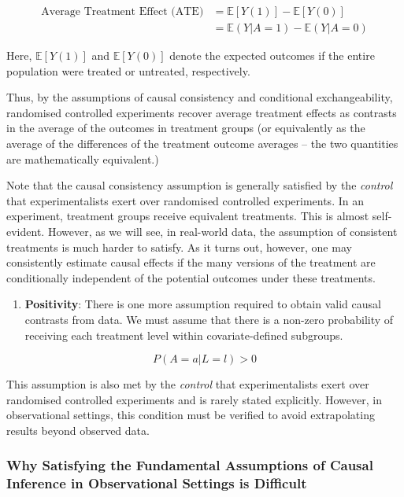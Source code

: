 \documentclass[
  singlecolumn]{article}
\providecommand{\tightlist}{%
  \setlength{\itemsep}{0pt}\setlength{\parskip}{0pt}}\usepackage{longtable,booktabs,array}
\begin{document}
\[
\begin{aligned}
\text{Average Treatment Effect (ATE)} &= \mathbb{E}[Y(1)] - \mathbb{E}[Y(0)] \\
&= \mathbb{E}(Y|A=1) - \mathbb{E}(Y|A=0)
\end{aligned}
\]

Here, \(\mathbb{E}[Y(1)]\) and \(\mathbb{E}[Y(0)]\) denote the expected
outcomes if the entire population were treated or untreated,
respectively.

Thus, by the assumptions of causal consistency and conditional
exchangeability, randomised controlled experiments recover average
treatment effects as contrasts in the average of the outcomes in
treatment groups (or equivalently as the average of the differences of
the treatment outcome averages -- the two quantities are mathematically
equivalent.)

Note that the causal consistency assumption is generally satisfied by
the \emph{control} that experimentalists exert over randomised
controlled experiments. In an experiment, treatment groups receive
equivalent treatments. This is almost self-evident. However, as we will
see, in real-world data, the assumption of consistent treatments is much
harder to satisfy. As it turns out, however, one may consistently
estimate causal effects if the many versions of the treatment are
conditionally independent of the potential outcomes under these
treatments.

\begin{enumerate}
\def\labelenumi{\arabic{enumi}.}
\setcounter{enumi}{2}
\tightlist
\item
  \textbf{Positivity}: There is one more assumption required to obtain
  valid causal contrasts from data. We must assume that there is a
  non-zero probability of receiving each treatment level within
  covariate-defined subgroups.
\end{enumerate}

\[
P(A = a | L= l) > 0
\]

This assumption is also met by the \emph{control} that experimentalists
exert over randomised controlled experiments and is rarely stated
explicitly. However, in observational settings, this condition must be
verified to avoid extrapolating results beyond observed data.

\subsubsection{Why Satisfying the Fundamental Assumptions of Causal
Inference in Observational Settings is
Difficult}\label{why-satisfying-the-fundamental-assumptions-of-causal-inference-in-observational-settings-is-difficult}
\end{document}
